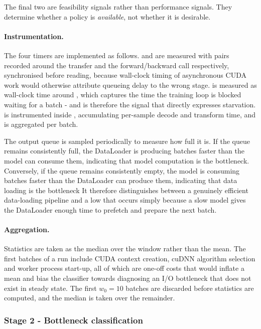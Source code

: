 The final two are feasibility signals rather than performance signals. They
determine whether a policy is \emph{available}, not whether it is desirable.

\paragraph{Instrumentation.}
The four timers are implemented as follows.
\Tgpu{} and \Thtod{} are measured with  pairs recorded around
the transfer and the forward/backward call respectively, synchronised before
reading, because wall-clock timing of asynchronous CUDA work would otherwise
attribute queueing delay to the wrong stage.
\Tdata{} is measured as wall-clock time around , which captures
the time the training loop is blocked waiting for a batch - and is therefore the
signal that directly expresses starvation.
\Tdecode{} is instrumented inside , accumulating per-sample
decode and transform time, and is aggregated per batch.

The output queue is sampled periodically to measure how full it is. If the queue remains consistently full, the DataLoader is producing batches faster than the model can consume them, indicating that model computation is the bottleneck. Conversely, if the queue remains consistently empty, the model is consuming batches faster than the DataLoader can produce them, indicating that data loading is the bottleneck
It therefore distinguishes between a genuinely efficient data-loading pipeline and a low \Tdata{} that occurs simply because a slow model gives the DataLoader enough time to prefetch and prepare the next batch.


\paragraph{Aggregation.}
Statistics are taken as the median over the window rather than the mean.
The first batches of a run include CUDA context creation, cuDNN algorithm selection
and worker process start-up, all of which are one-off costs that would inflate a
mean and bias the classifier towards diagnosing an I/O bottleneck that does not
exist in steady state.
The first $w_0 = 10$ batches are discarded before statistics are computed, and the
median is taken over the remainder.

\subsubsection{Stage 2 - Bottleneck classification}

